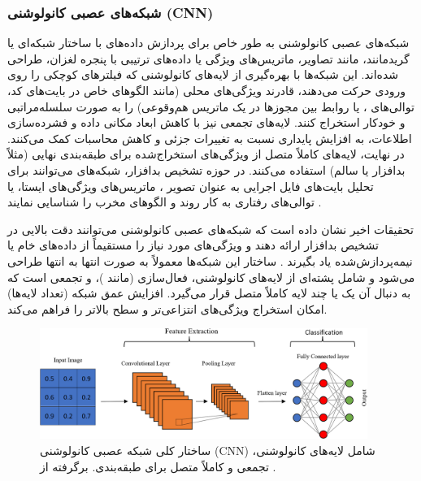 \subsubsection{شبکه‌های عصبی کانولوشنی (CNN)}
شبکه‌های عصبی کانولوشنی  به طور خاص برای پردازش داده‌های با ساختار شبکه‌ای یا گریدمانند، مانند تصاویر، ماتریس‌های ویژگی یا داده‌های ترتیبی با پنجره لغزان، طراحی شده‌اند. این شبکه‌ها با بهره‌گیری از لایه‌های کانولوشنی که فیلترهای کوچکی را روی ورودی حرکت می‌دهند، قادرند ویژگی‌های محلی (مانند الگوهای خاص در بایت‌های کد، توالی‌های ، یا روابط بین مجوزها در یک ماتریس هم‌وقوعی) را به صورت سلسله‌مراتبی و خودکار استخراج کنند. لایه‌های تجمعی  نیز با کاهش ابعاد مکانی داده و فشرده‌سازی اطلاعات، به افزایش پایداری نسبت به تغییرات جزئی و کاهش محاسبات کمک می‌کنند. در نهایت، لایه‌های کاملاً متصل  از ویژگی‌های استخراج‌شده برای طبقه‌بندی نهایی (مثلاً بدافزار یا سالم) استفاده می‌کنند. در حوزه تشخیص بدافزار، شبکه‌های  می‌توانند برای تحلیل بایت‌های فایل اجرایی به عنوان تصویر ، ماتریس‌های ویژگی‌های ایستا، یا توالی‌های رفتاری به کار روند و الگوهای مخرب را شناسایی نمایند \cite{Vinayakumar2019}.

تحقیقات اخیر نشان داده است که شبکه‌های عصبی کانولوشنی می‌توانند دقت بالایی در تشخیص بدافزار ارائه دهند و ویژگی‌های مورد نیاز را مستقیماً از داده‌های خام یا نیمه‌پردازش‌شده یاد بگیرند \cite{Alsaleh2023}. ساختار این شبکه‌ها معمولاً به صورت انتها به انتها  طراحی می‌شود و شامل پشته‌ای از لایه‌های کانولوشنی، فعال‌سازی (مانند )، و تجمعی است که به دنبال آن یک یا چند لایه کاملاً متصل قرار می‌گیرد. افزایش عمق شبکه (تعداد لایه‌ها) امکان استخراج ویژگی‌های انتزاعی‌تر و سطح بالاتر را فراهم می‌کند.

\begin{figure}[!t]
    \centering
    \includegraphics[width=0.95\textwidth]{images/cnn_structure}
    \caption{ساختار کلی شبکه عصبی کانولوشنی (CNN) شامل لایه‌های کانولوشنی، تجمعی و کاملاً متصل برای طبقه‌بندی. برگرفته از \cite{Alsaleh2023}.}
    \label{fig:cnn_structure}
\end{figure}

